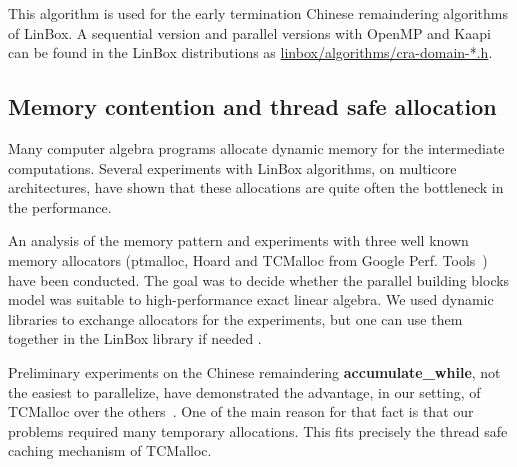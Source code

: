 \documentclass[runningheads,a4paper]{llncs}
\newcommand{\linbox}{{\sc LinBox}\xspace}
\begin{document}
  This algorithm is used 
  for the early termination Chinese remaindering algorithms of
  \linbox. A sequential version and parallel versions with OpenMP and
  Kaapi can be found in the \linbox distributions as 
  \url{linbox/algorithms/cra-domain-*.h}.



\subsection{Memory contention and thread safe allocation}
Many computer algebra programs allocate dynamic memory for the
intermediate computations. Several experiments with \linbox
algorithms, on multicore architectures, have shown that these
allocations are quite often the bottleneck in the performance.

An analysis of the memory pattern and experiments with three well
known memory allocators 
(ptmalloc, Hoard and TCMalloc from Google Perf. Tools~\cite{tcmalloc})
have been conducted. The goal was to decide whether the parallel
building blocks model was suitable to high-performance exact linear
algebra. We used dynamic libraries to exchange allocators for the
experiments, but one can use them together in the \linbox library if
needed \cite[\S 7]{kaltofen:2005:memory}.

Preliminary experiments on the Chinese remaindering {\bf accumulate\_while},
not the easiest to parallelize, have demonstrated the advantage, in
our setting, of TCMalloc over the others~\cite{jgd:2010:crt}.
One of the main reason for that fact is that our problems required
many temporary allocations. This fits precisely the thread safe caching
mechanism of TCMalloc.
\end{document}
